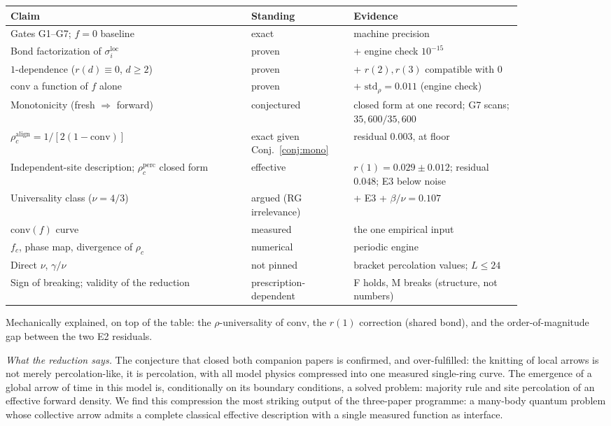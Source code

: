 \documentclass[11pt]{article}
\newcommand{\conv}{\mathrm{conv}}
\newcommand{\rhoalign}{\rho_c^{\mathrm{align}}}
\newcommand{\rhoperc}{\rho_c^{\mathrm{perc}}}
\begin{document}
\begin{center}
\small
\begin{tabular}{p{0.40\linewidth}p{0.17\linewidth}p{0.28\linewidth}}
\toprule
Claim & Standing & Evidence \\
\midrule
Gates G1--G7; $f{=}0$ baseline & exact & machine precision \\
Bond factorization of $\sigma_i^{\mathrm{loc}}$ & proven & + engine check $10^{-15}$ \\
$1$-dependence ($r(d) \equiv 0$, $d \ge 2$) & proven & + $r(2),r(3)$ compatible with $0$ \\
$\conv$ a function of $f$ alone & proven & + $\mathrm{std}_\rho = 0.011$ (engine check) \\
Monotonicity (fresh $\Rightarrow$ forward) & conjectured & closed form at one record; G7 scans; $35{,}600/35{,}600$ \\
$\rhoalign = 1/[2(1-\conv)]$ & exact given Conj.~\ref{conj:mono} & residual $0.003$, at floor \\
Independent-site description; $\rhoperc$ closed form & effective & $r(1) = 0.029 \pm 0.012$; residual $0.048$; E3 below noise \\
Universality class ($\nu = 4/3$) & argued (RG irrelevance) & \cite{harris1974,weinrib,weinrib1984} + E3 + $\beta/\nu = 0.107$ \\
$\conv(f)$ curve & measured & the one empirical input \\
$f_c$, phase map, divergence of $\rho_c$ & numerical & periodic engine \\
Direct $\nu$, $\gamma/\nu$ & not pinned & bracket percolation values; $L \le 24$ \\
Sign of breaking; validity of the reduction & prescription-dependent & F holds, M breaks (structure, not numbers) \\
\bottomrule
\end{tabular}
\end{center}

Mechanically explained, on top of the table: the $\rho$-universality of
$\conv$, the $r(1)$ correction (shared bond), and the order-of-magnitude
gap between the two E2 residuals.

\emph{What the reduction says.} The conjecture that closed both companion
papers is confirmed, and over-fulfilled: the knitting of local arrows is
not merely percolation-like, it is percolation, with all model physics
compressed into one measured single-ring curve. The emergence of a global
arrow of time in this model is, conditionally on its boundary conditions, a
solved problem: majority rule and site percolation of an effective forward
density. We find this compression the most striking output of the
three-paper programme: a many-body quantum problem whose collective arrow
admits a complete classical effective description with a single measured
function as interface.
\end{document}
